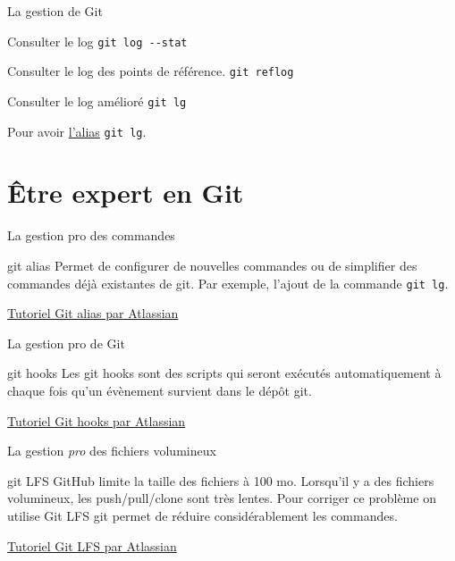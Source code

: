 \documentclass[11pt]{beamer}
\begin{document}
\begin{frame}[fragile]{La gestion de Git}
	\begin{block}{Consulter le log}
		\verb|git log --stat|
	\end{block}
	\begin{block}{Consulter le log des points de référence.}
		\verb|git reflog| 
	\end{block}
	\begin{block}{Consulter le log amélioré}
		\verb|git lg|
	\end{block}
	Pour avoir \href{https://gist.github.com/johanmeiring/3002458}{l'alias} \verb|git lg|.
\end{frame}


\section{Être expert en Git}

\begin{frame}[fragile]{La gestion pro des commandes}
	\begin{block}{git alias}
		Permet de configurer de nouvelles commandes ou de simplifier des commandes déjà existantes de git. Par exemple, l'ajout de la commande \verb|git lg|.
	\end{block}
\href{https://www.atlassian.com/git/tutorials/git-alias}{Tutoriel Git alias par Atlassian}
\end{frame}

\begin{frame}[fragile]{La gestion pro de Git}
	\begin{block}{git hooks}
		Les git hooks sont des scripts qui seront exécutés automatiquement à chaque fois qu'un évènement survient dans le dépôt git. 
	\end{block}
\href{https://www.atlassian.com/git/tutorials/git-hooks}{Tutoriel Git hooks par Atlassian}
\end{frame}

\begin{frame}[fragile]{La gestion \textit{pro} des fichiers volumineux}
	\begin{block}{git LFS} 
		GitHub limite la taille des fichiers à 100 mo. Lorsqu'il y a des fichiers volumineux, les push/pull/clone sont très lentes. Pour corriger ce problème on utilise Git LFS git permet de réduire considérablement les commandes.
	\end{block}
	\href{https://www.atlassian.com/git/tutorials/git-lfs}{Tutoriel Git LFS par Atlassian}
\end{frame}
\end{document}
